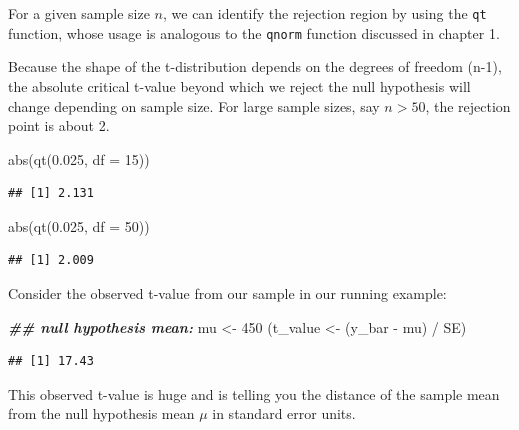 \documentclass[
  12pt,
]{krantz}
\newenvironment{Shaded}{\begin{snugshade}}{\end{snugshade}}
\newcommand{\AttributeTok}[1]{\textcolor[rgb]{0.77,0.63,0.00}{#1}}
\newcommand{\DecValTok}[1]{\textcolor[rgb]{0.00,0.00,0.81}{#1}}
\newcommand{\DocumentationTok}[1]{\textcolor[rgb]{0.56,0.35,0.01}{\textbf{\textit{#1}}}}
\newcommand{\FloatTok}[1]{\textcolor[rgb]{0.00,0.00,0.81}{#1}}
\newcommand{\FunctionTok}[1]{\textcolor[rgb]{0.00,0.00,0.00}{#1}}
\newcommand{\NormalTok}[1]{#1}
\newcommand{\OtherTok}[1]{\textcolor[rgb]{0.56,0.35,0.01}{#1}}
\newcommand{\SpecialCharTok}[1]{\textcolor[rgb]{0.00,0.00,0.00}{#1}}
\theoremstyle{definition}
\theoremstyle{definition}
\theoremstyle{definition}
\theoremstyle{definition}
\theoremstyle{remark}
\begin{document}
For a given sample size \(n\), we can identify the rejection region by using the \texttt{qt} function, whose usage is analogous to the \texttt{qnorm} function discussed in chapter 1.

Because the shape of the t-distribution depends on the degrees of freedom (n-1), the absolute critical t-value beyond which we reject the null hypothesis will change depending on sample size. For large sample sizes, say \(n>50\), the rejection point is about 2.

\begin{Shaded}
\begin{Highlighting}[]
\FunctionTok{abs}\NormalTok{(}\FunctionTok{qt}\NormalTok{(}\FloatTok{0.025}\NormalTok{, }\AttributeTok{df =} \DecValTok{15}\NormalTok{))}
\end{Highlighting}
\end{Shaded}

\begin{verbatim}
## [1] 2.131
\end{verbatim}

\begin{Shaded}
\begin{Highlighting}[]
\FunctionTok{abs}\NormalTok{(}\FunctionTok{qt}\NormalTok{(}\FloatTok{0.025}\NormalTok{, }\AttributeTok{df =} \DecValTok{50}\NormalTok{))}
\end{Highlighting}
\end{Shaded}

\begin{verbatim}
## [1] 2.009
\end{verbatim}

Consider the observed t-value from our sample in our running example:

\begin{Shaded}
\begin{Highlighting}[]
\DocumentationTok{\#\# null hypothesis mean:}
\NormalTok{mu }\OtherTok{\textless{}{-}} \DecValTok{450}
\NormalTok{(t\_value }\OtherTok{\textless{}{-}}\NormalTok{ (y\_bar }\SpecialCharTok{{-}}\NormalTok{ mu) }\SpecialCharTok{/}\NormalTok{ SE)}
\end{Highlighting}
\end{Shaded}

\begin{verbatim}
## [1] 17.43
\end{verbatim}

This observed t-value is huge and is telling you the distance of the sample mean from the null hypothesis mean \(\mu\) in standard error units.
\end{document}
